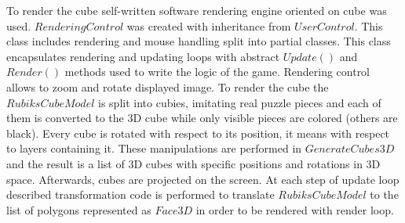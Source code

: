 \documentclass[../../main.tex]{subfiles}
\begin{document}
To render the cube self-written software rendering engine oriented on cube was used. $RenderingControl$ was created with inheritance from $UserControl$. This class includes rendering and mouse handling split into partial classes. This class encapsulates rendering and updating loops with abstract $Update()$ and $Render()$ methods used to write the logic of the game. Rendering control allows to zoom and rotate displayed image. To render the cube the $RubiksCubeModel$ is split into cubies, imitating real puzzle pieces and each of them is converted to the 3D cube while only visible pieces are colored (others are black). Every cube is rotated with respect to its position, it means with respect to layers containing it. These manipulations are performed in $GenerateCubes3D$ and the result is a list of 3D cubes with specific positions and rotations in 3D space. Afterwards, cubes are projected on the screen. At each step of update loop described transformation code is performed to translate $RubiksCubeModel$ to the list of polygons represented as $Face3D$ in order to be rendered with render loop.
\end{document}
